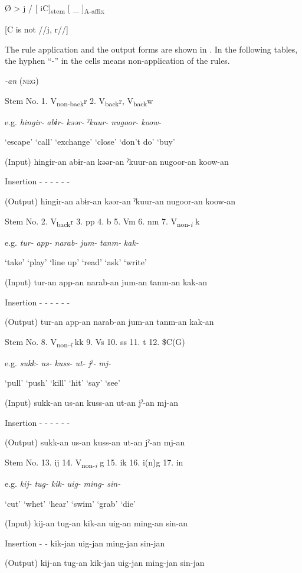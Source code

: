 \ea\label{ex:8-11}
  Ø  >  j  /  [   iC]\textsubscript{stem}  [ \_   ]\textsubscript{A-affix}

          [C is not //j, r//]  
\z

The rule application and the output forms are shown in . In the following tables, the hyphen “-” in the cells means non-application of the rules.

\begin{table}
\caption{\label{tab:key:60}Verbal stems +} \textmd{\textit{-an}}\textmd{ (\textsc{neg})}

Stem No.  1. V\textsubscript{non-back}r  2. V\textsubscript{back}r, V\textsubscript{back}w

e.g.  \textit{hingir-}  \textit{abɨr-}  \textit{kəər-}  \textit{ˀkuur-}  \textit{nugoor-}  \textit{koow-}

  ‘escape’  ‘call’  ‘exchange’  ‘close’  ‘don’t do’  ‘buy’

(Input)  hingir-an  abɨr-an  kəər-an  ˀkuur-an  nugoor-an  koow-an

Insertion  -  -  -  -  -  -

(Output)  hingir-an  abɨr-an  kəər-an  ˀkuur-an  nugoor-an  koow-an

Stem No.  2. V\textsubscript{back}r  3. pp  4. b  5. Vm  6. nm  7. V\textsubscript{non-}\textit{\textsubscript{i} }k

e.g.  \textit{tur-}  \textit{app-}  \textit{narab-}  \textit{jum-}  \textit{tanm-}  \textit{kak-}

  ‘take’  ‘play’  ‘line up’  ‘read’  ‘ask’  ‘write’

(Input)  tur-an  app-an  narab-an  jum-an  tanm-an  kak-an

Insertion  -  -  -  -  -  -

(Output)  tur-an  app-an  narab-an  jum-an  tanm-an  kak-an

Stem No.  8. V\textsubscript{non-}\textit{\textsubscript{i} }kk  9. Vs  10. ss  11. t  12. \$C(G)

e.g.  \textit{sukk-}  \textit{us-}  \textit{kuss-}  \textit{ut-}  \textit{jˀ-}  \textit{mj-}

  ‘pull’  ‘push’  ‘kill’  ‘hit’  ‘say’  ‘see’

(Input)  sukk-an  us-an  kuss-an  ut-an  jˀ-an  mj-an

Insertion  -  -  -  -  -  -

(Output)  sukk-an  us-an  kuss-an  ut-an  jˀ-an  mj-an

Stem No.  13. ij  14. V\textsubscript{non-}\textit{\textsubscript{i}} g  15. ik  16. i(n)g    17. in

e.g.  \textit{kij-}  \textit{tug-}  \textit{kik-}  \textit{uig-}  \textit{ming-}  \textit{sin-}

  ‘cut’  ‘whet’  ‘hear’  ‘swim’  ‘grab’  ‘die’

(Input)  kij-an  tug-an  kik-an  uig-an  ming-an  sin-an

Insertion  -  -  kik-jan  uig-jan  ming-jan  sin-jan

(Output)  kij-an  tug-an  kik-jan  uig-jan  ming-jan  sin-jan
\end{table}

